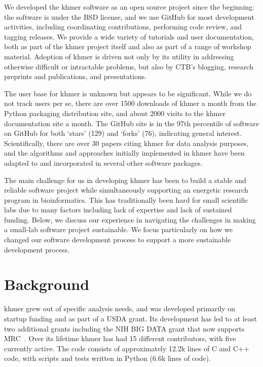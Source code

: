 \documentclass[12pt]{article}
\begin{document}
We developed the khmer software as an open source project since the
beginning: the software is under the BSD license, and we use GitHub
for most development activities, including coordinating contributions,
performing code review, and tagging releases.  We provide a wide
variety of tutorials and user documentation, both as part of the khmer
project itself and also as part of a range of workshop material.
Adoption of khmer is driven not only by its utility in addressing
otherwise difficult or intractable problems, but also by CTB's
blogging, research preprints and publications, and presentations.

The user base for khmer is unknown but appears to be significant.
While we do not track users per se, there are over 1500 downloads of
khmer a month from the Python packaging distribution site, and about
2000 visits to the khmer documentation site a month.  The GitHub site
is in the 97th percentile of software on GitHub for both `stars' (129)
and `forks' (76), indicating general interest.  Scientifically, there
are over 30 papers citing khmer for data analysis purposes, and the
algorithms and approaches initially implemented in khmer have been
adapted to and incorporated in several other software packages.

The main challenge for us in developing khmer has been to build a
stable and reliable software project while simultaneously supporting
an energetic research program in bioinformatics.  This has
traditionally been hard for small scientific labs due to many factors
including lack of expertise and lack of sustained funding.  Below, we
discuss our experience in navigating the challenges in making a
small-lab software project sustainable.  We focus particularly on how
we changed our software development process to support a more
sustainable development process.

\section{Background}

khmer grew out of specific analysis needs, and was developed primarily
on startup funding and as part of a USDA grant.  Its development has
led to at least two additional grants including the NIH BIG DATA
grant that now supports MRC~\cite{brown2012bigdata}.  Over its lifetime
khmer has had 15 different contributors, with five currently active.
The code consists of approximately 12.2k lines of C and C++ code, with
scripts and tests written in Python (6.6k lines of code).
\end{document}
